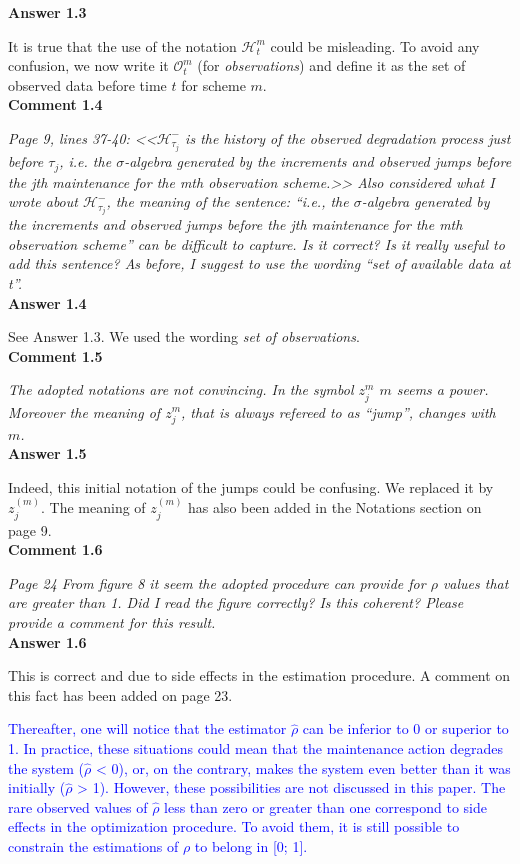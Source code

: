 { \bf Answer 1.3}

It is true that the use of the notation $\mathcal{H}_t^m$ could be misleading. To avoid any confusion, we now write it $\mathcal{O}_t^m$ (for {\it observations}) and define it as the set of observed data before time $t$ for scheme $m$.\\

{ \bf Comment 1.4 }

{\it Page 9, lines 37-40: <<$\mathcal{H}_{\tau_j}^-$ is the history of the observed degradation process just before $\tau_j$, i.e. the $\sigma$-algebra generated
by the increments and observed jumps before the jth maintenance for the mth observation scheme.>>
Also considered what I wrote about $\mathcal{H}_{\tau_j}^-$, the meaning of the sentence: “i.e., the $\sigma$-algebra generated by the
increments and observed jumps before the jth maintenance for the mth observation scheme” can be difficult to capture. Is it correct? Is it really useful to add this sentence? As before, I suggest to use the wording “set of available data at t”.}\\


{ \bf Answer 1.4}

See Answer 1.3. We used the wording {\it set of observations}.\\


{ \bf Comment 1.5 }

{\it The adopted notations are not convincing. In the symbol $z_j^m$
$m$ seems a power. Moreover the meaning of $z_j^m$, that
is always refereed to as “jump”, changes with $m$.}\\


{ \bf Answer 1.5}

Indeed, this initial notation of the jumps could be confusing. We replaced it by $z_j^{(m)}$. The meaning of $z_j^{(m)}$ has also been added in the Notations section on page 9.\\

{ \bf Comment 1.6 }

{\it Page 24 From figure 8 it seem the adopted procedure can provide for $\rho$ values that are greater than 1. Did I read the figure correctly? Is this coherent?
Please provide a comment for this result.}\\

{ \bf Answer 1.6}

This is correct and due to side effects in the estimation procedure. A comment on this fact has been added on page 23.

\textcolor{blue}{Thereafter, one will notice that the estimator $\hat \rho$ can be inferior to 0 or superior to 1. In practice, these situations could mean that the maintenance action degrades the system ($\hat \rho$ < 0), or, on the contrary, makes the system even better than it was initially ($\hat \rho$ > 1). However, these possibilities are not discussed in this paper. The rare observed values of $\hat \rho$ less than zero or greater than one correspond to side effects in the optimization procedure. To avoid them, it is still possible to constrain the estimations of $\rho$ to belong in [0; 1].}\\



